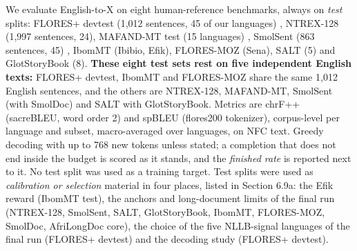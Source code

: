 We evaluate English-to-X on eight human-reference benchmarks, always on \emph{test} splits: FLORES+ devtest (1,012 sentences, 45 of our languages) \citep{oldi2025floresplus, goyal2022flores101, nllb2022nllb}, NTREX-128 (1,997 sentences, 24), MAFAND-MT test (15 languages) \citep{adelani2022mafand}, SmolSent (863 sentences, 45) \citep{caswell2025smol}, IbomMT (Ibibio, Efik), FLORES-MOZ (Sena), SALT (5) \citep{akera2022salt} and GlotStoryBook (8). \textbf{These eight test sets rest on five independent English texts:} FLORES+ devtest, IbomMT and FLORES-MOZ share the same 1,012 English sentences, and the others are NTREX-128, MAFAND-MT, SmolSent (with SmolDoc) and SALT with GlotStoryBook. Metrics are chrF++ (sacreBLEU, word order 2) \citep{popovic2017chrfpp} and spBLEU (flores200 tokenizer), corpus-level per language and subset, macro-averaged over languages, on NFC text. Greedy decoding with up to 768 new tokens unless stated; a completion that does not end inside the budget is scored as it stands, and the \emph{finished rate} is reported next to it. No test split was used as a training target. Test splits were used as \emph{calibration or selection} material in four places, listed in Section 6.9a: the Efik reward (IbomMT test), the anchors and long-document limits of the final run (NTREX-128, SmolSent, SALT, GlotStoryBook, IbomMT, FLORES-MOZ, SmolDoc, AfriLongDoc core), the choice of the five NLLB-signal languages of the final run (FLORES+ devtest) and the decoding study (FLORES+ devtest).

